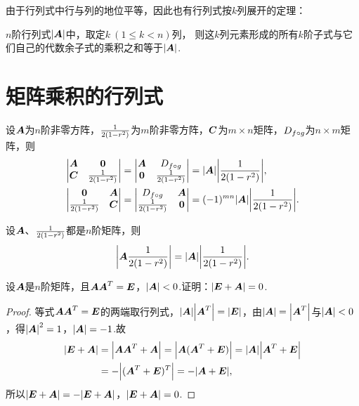 由于行列式中行与列的地位平等，因此也有行列式按\(k\)列展开的定理：
\begin{theorem}\label{theorem:行列式.行列式按k列展开}
\(n\)阶行列式\(\abs{\A}\)中，取定\(k\ (1 \leqslant k < n)\)列，
则这\(k\)列元素形成的所有\(k\)阶子式与它们自己的代数余子式的乘积之和等于\(\abs{\A}\).
\end{theorem}


\section{矩阵乘积的行列式}
\begin{lemma}
设\(\A\)为\(n\)阶非零方阵，\(\B\)为\(m\)阶非零方阵，\(\C\)为\(m \times n\)矩阵，\(\D\)为\(n \times m\)矩阵，则\begin{align}
\begin{vmatrix}
\A & \z \\
\C & \B
\end{vmatrix}
&= \begin{vmatrix}
\A & \D \\
\z & \B
\end{vmatrix}
= \abs{\A} \abs{\B}, \label{equation:行列式.广义三角阵的行列式1} \\
\begin{vmatrix}
\z & \A \\ \B & \C \end{vmatrix}
&= \begin{vmatrix} \D & \A \\ \B & \z \end{vmatrix}
= (-1)^{mn} \abs{\A} \abs{\B}. \label{equation:行列式.广义三角阵的行列式2}
\end{align}
\end{lemma}

\begin{theorem}[矩阵乘积的行列式定理]\label{theorem:行列式.矩阵乘积的行列式}
设\(\A\)、\(\B\)都是\(n\)阶矩阵，则\begin{equation}
\abs{\A\B} = \abs{\A} \abs{\B}.
\end{equation}
\end{theorem}

\begin{example}
设\(\A\)是\(n\)阶矩阵，且\(\A\A^T = \E\)，\(\abs{\A}<0\).证明：\(\abs{\E+\A}=0\).
\begin{proof}
等式\(\A\A^T=\E\)的两端取行列式，\(\abs{\A} \abs{\A^T} = \abs{\E}\)，由\(\abs{\A} = \abs{\A^T}\)与\(\abs{\A} < 0\)，得\(\abs{\A}^2 = 1\)，\(\abs{\A} = -1\).故\begin{align*}
\abs{\E+\A}
&= \abs{\A\A^T+\A}
= \abs{\A(\A^T+\E)}
= \abs{\A} \abs{\A^T+\E} \\
&= -\abs{(\A^T+\E)^T}
= -\abs{\A+\E},
\end{align*}所以\(\abs{\E+\A} = -\abs{\E+\A}\)，\(\abs{\E+\A}=0\).
\end{proof}
\end{example}

